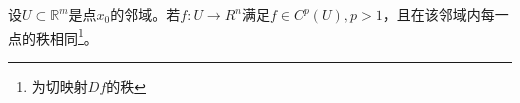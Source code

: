 
\begin{theorem}{}
设$U\subset \mathbb R^m$是点$x_0$的邻域。若$f:U\rightarrow R^n$满足$f\in C^p(U),p>1$，且在该邻域内每一点的秩相同\footnote{为切映射$Df$的秩}。
\end{theorem}
